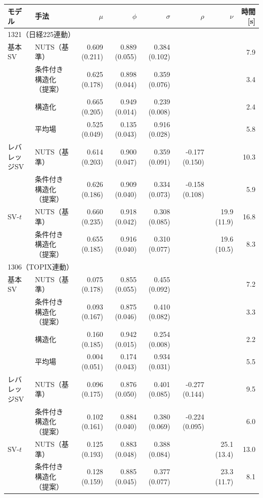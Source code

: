 \begin{tabular}{llrrrrrr}
\toprule
モデル & 手法 & $\mu$ & $\phi$ & $\sigma$ & $\rho$ & $\nu$ & 時間[s] \\
\midrule
\multicolumn{8}{l}{1321（日経225連動）} \\
基本SV & NUTS（基準） & 0.609 (0.211) & 0.889 (0.055) & 0.384 (0.102) &  &  & 7.9 \\
 & 条件付き構造化（提案） & 0.625 (0.178) & 0.898 (0.044) & 0.359 (0.076) &  &  & 3.4 \\
 & 構造化 & 0.665 (0.205) & 0.949 (0.014) & 0.239 (0.008) &  &  & 2.4 \\
 & 平均場 & 0.525 (0.049) & 0.135 (0.043) & 0.916 (0.028) &  &  & 5.8 \\
\addlinespace
レバレッジSV & NUTS（基準） & 0.614 (0.203) & 0.900 (0.047) & 0.359 (0.091) & -0.177 (0.150) &  & 10.3 \\
 & 条件付き構造化（提案） & 0.626 (0.186) & 0.909 (0.040) & 0.334 (0.073) & -0.158 (0.108) &  & 5.9 \\
\addlinespace
SV-$t$ & NUTS（基準） & 0.660 (0.235) & 0.918 (0.042) & 0.308 (0.085) &  & 19.9 (11.9) & 16.8 \\
 & 条件付き構造化（提案） & 0.655 (0.185) & 0.916 (0.040) & 0.310 (0.077) &  & 19.6 (10.5) & 8.3 \\
\midrule
\multicolumn{8}{l}{1306（TOPIX連動）} \\
基本SV & NUTS（基準） & 0.075 (0.178) & 0.855 (0.055) & 0.455 (0.092) &  &  & 7.2 \\
 & 条件付き構造化（提案） & 0.093 (0.167) & 0.875 (0.046) & 0.410 (0.082) &  &  & 3.3 \\
 & 構造化 & 0.160 (0.185) & 0.942 (0.015) & 0.254 (0.008) &  &  & 2.2 \\
 & 平均場 & 0.004 (0.051) & 0.174 (0.043) & 0.934 (0.031) &  &  & 5.5 \\
\addlinespace
レバレッジSV & NUTS（基準） & 0.096 (0.175) & 0.876 (0.050) & 0.401 (0.085) & -0.277 (0.144) &  & 9.5 \\
 & 条件付き構造化（提案） & 0.102 (0.161) & 0.884 (0.040) & 0.380 (0.069) & -0.224 (0.095) &  & 6.0 \\
\addlinespace
SV-$t$ & NUTS（基準） & 0.125 (0.193) & 0.883 (0.048) & 0.388 (0.084) &  & 25.1 (13.4) & 13.0 \\
 & 条件付き構造化（提案） & 0.128 (0.159) & 0.885 (0.045) & 0.377 (0.077) &  & 23.3 (11.7) & 8.1 \\
\bottomrule
\end{tabular}
